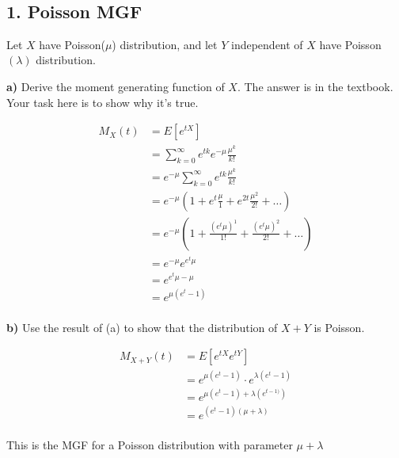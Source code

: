 \documentclass[11pt]{article}
\begin{document}
    \begin{center}
    \end{center}
    { \hspace*{\fill} \\}
    
    \newpage

    \hypertarget{poisson-mgf}{%
\subsection{1. Poisson MGF}\label{poisson-mgf}}

Let \(X\) have Poisson(\(\mu\)) distribution, and let \(Y\) independent
of \(X\) have Poisson \((\lambda)\) distribution.

\textbf{a)} Derive the moment generating function of \(X\). The answer
is in the textbook. Your task here is to show why it's true.

\begin{align*}
	M_{X}(t) &= E[e^{tX}] \\
	&= \sum_{k=0}^{\infty } e^{tk} e^{-\mu } \frac{\mu ^{k}}{k!} \\
	&= e^{-\mu } \sum_{k=0}^{\infty } e^{tk} \frac{\mu ^{k}}{k!} \\
	&= e^{-\mu } \left( 1 + e^{t} \frac{\mu }{1} + e^{2t} \frac{\mu ^{2}}{2!} + \dots\right)  \\
	&= e^{-\mu } \left( 1 + \frac{\left( e^{t}\mu  \right)^{1} }{1!} + \frac{\left( e^{t}\mu  \right) ^{2}}{2!} + \dots \right)  \\
	&= e^{-\mu } e^{e^{t}\mu } \\
	&= e^{e^{t}\mu  - \mu } \\
	&= e^{\mu ( e^{t} - 1)} \\
\end{align*}



\textbf{b)} Use the result of (a) to show that the distribution of
\(X+Y\) is Poisson.


\begin{align*}
	M_{X+Y}(t) &= E[e^{tX}e^{tY}] \\
	&= e^{\mu (e^{t}-1)} \cdot e^{\lambda (e^{t}-1)} \\
	&= e^{\mu (e^{t}-1) + \lambda(e^{t-1)})} \\
	&= e^{(e^{t}-1)(\mu +\lambda)} \\
\end{align*}

This is the MGF for a Poisson distribution with parameter $\mu + \lambda$ 
\end{document}
